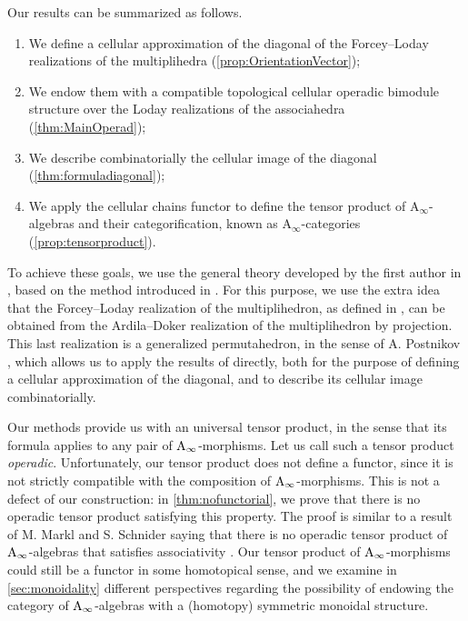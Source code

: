 \documentclass[twoside, 12pt]{amsart}
\theoremstyle{remark}
\begin{document}
\medskip

Our results can be summarized as follows.
\begin{enumerate}[leftmargin=*]
  \item We define a cellular approximation of the diagonal of the Forcey--Loday realizations of the multiplihedra (\cref{prop:OrientationVector});
  \item We endow them with a compatible topological cellular operadic bimodule structure over the Loday realizations of the associahedra (\cref{thm:MainOperad});
  \item We describe combinatorially the cellular image of the diagonal (\cref{thm:formuladiagonal});
  \item We apply the cellular chains functor to define the tensor product of $\mathrm{A}_\infty$-algebras and their categorification, known as $\mathrm{A}_\infty$-categories (\cref{prop:tensorproduct}).
\end{enumerate}


To achieve these goals, we use the general theory developed by the first author in \cite{LA21}, based on the method introduced in \cite{MTTV19}.
For this purpose, we use the extra idea that the Forcey--Loday realization of the multiplihedron, as defined in \cite{Forcey08}, can be obtained from the Ardila--Doker realization of the multiplihedron \cite{AD13} by projection.
This last realization is a generalized permutahedron, in the sense of A. Postnikov \cite{Postnikov09}, which allows us to apply the results of \cite{LA21} directly, both for the purpose of defining a cellular approximation of the diagonal, and to describe its cellular image combinatorially.

\medskip

Our methods provide us with an universal tensor product, in the sense that its formula applies to any pair of $\mathrm{A}_\infty$-morphisms.
Let us call such a tensor product \emph{operadic}. 
Unfortunately, our tensor product does not define a functor, since it is not strictly compatible with the composition of $\mathrm{A}_\infty$-morphisms. 
This is not a defect of our construction: in \cref{thm:nofunctorial}, we prove that there is no operadic tensor product satisfying this property. 
The proof is similar to a result of M. Markl and S. Schnider saying that there is no operadic tensor product of $\mathrm{A}_\infty$-algebras that satisfies associativity \cite[Theorem 13]{MarklShnider06}.
Our tensor product of $\mathrm{A}_\infty$-morphisms could still be a functor in some homotopical sense, and we examine in \cref{sec:monoidality} different perspectives regarding the possibility of endowing the category of $\mathrm{A}_\infty$-algebras with a (homotopy) symmetric monoidal structure. 
\end{document}
